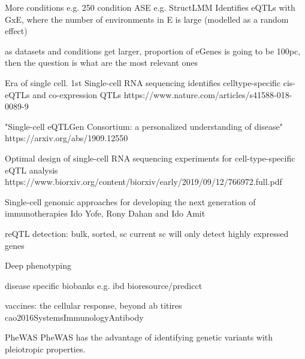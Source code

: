 \begin{outline}
    More conditions
    e.g. 250 condition ASE %
    e.g. StructLMM 
        Identifies eQTLs with GxE, where the number of environments in E is large (modelled as a random effect)

    as datasets and conditions get larger, proportion of eGenes is going to be 100pc, then the question is what are the most relevant ones

    Era of single cell.
        1st
        Single-cell RNA sequencing identifies celltype-specific cis-eQTLs and co-expression QTLs
        https://www.nature.com/articles/s41588-018-0089-9

        "Single-cell eQTLGen Consortium: a personalized understanding of disease"
        https://arxiv.org/abs/1909.12550

        Optimal design of single-cell RNA sequencing experiments for cell-type-specific eQTL analysis
        https://www.biorxiv.org/content/biorxiv/early/2019/09/12/766972.full.pdf

        Single-cell genomic approaches for developing the next generation of immunotherapies Ido Yofe, Rony Dahan and Ido Amit


        reQTL detection: bulk, sorted, sc
        current sc will only detect highly expressed genes


Deep phenotyping
        
        disease specific biobanks e.g. ibd bioresource/predicct

    vaccines:
        the cellular response, beyond ab titires cao2016SystemsImmunologyAntibody


    PheWAS\autocite{verma2017CurrentScopeChallenges}
    PheWAS has the advantage of identifying genetic variants with pleiotropic properties.


\end{outline}
